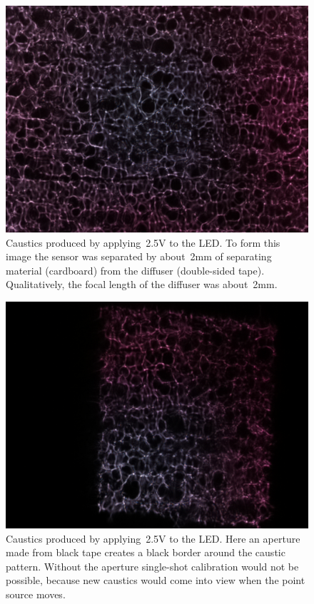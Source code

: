 \documentclass[final]{cvpr}
\begin{document}
\begin{figure}[t]
	\centering
	\includegraphics[width=1.0\linewidth]{images/caustic}
	\caption{\label{fig:caustic}
		Caustics produced by applying~\num{2.5}V to the LED\@.
		To form this image the sensor was separated by about~\num{2}mm
		of separating material (cardboard) from the diffuser (double-sided tape).
		Qualitatively, the focal length of the diffuser was about~\num{2}mm.}
\end{figure}


\begin{figure}[t]
	\centering
	\includegraphics[width=1.0\linewidth]{images/caustic-with-aperture}
	\caption{\label{fig:caustic-with-aperture}
		Caustics produced by applying~\num{2.5}V to the LED\@.
		Here an aperture made from black tape creates a black border
		around the caustic pattern.
		Without the aperture single-shot calibration would not be
		possible, because new caustics would come into view when the
		point source moves.}
\end{figure}
\end{document}

